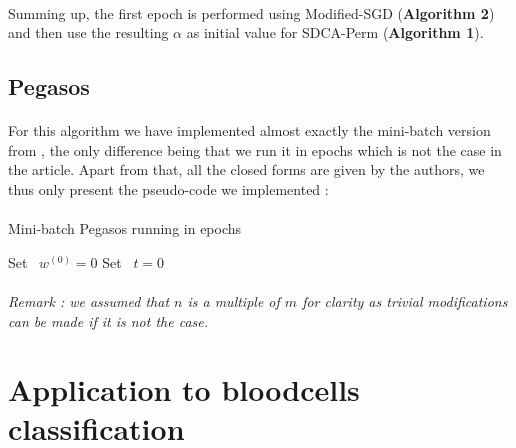 \documentclass[10pt,a4paper]{article}
\begin{document}
\paragraph{}
Summing up, the first epoch is performed using Modified-SGD (\textbf{Algorithm 2}) and then use the resulting $\alpha$ as initial value for SDCA-Perm (\textbf{Algorithm 1}).


\subsection{Pegasos}

\paragraph{}
For this algorithm we have implemented almost exactly the mini-batch version from \cite{1}, the only difference being that we run it in epochs which is not the case in the article. Apart from that, all the closed forms are given by the authors, we thus only present the pseudo-code we implemented : 


\paragraph{}
\begin{algorithm}[H]
\caption{Mini-batch Pegasos running in epochs}
\SetAlgoLined
{}
Set ~$w^{(0)} = 0$\;
Set ~$t = 0$\;
\end{algorithm}

\paragraph{}
\textit{Remark : we assumed that $n$ is a multiple of $m$ for clarity as trivial modifications can be made if it is not the case.}


\section{Application to bloodcells classification}
\end{document}
